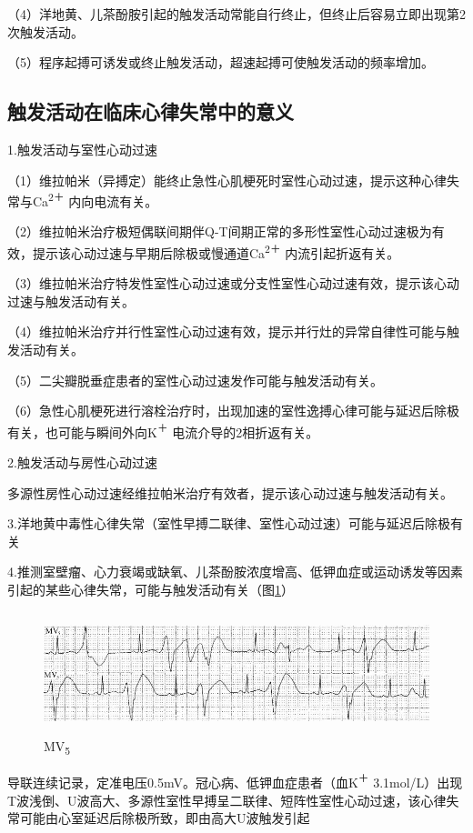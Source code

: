 （4）洋地黄、儿茶酚胺引起的触发活动常能自行终止，但终止后容易立即出现第2次触发活动。

（5）程序起搏可诱发或终止触发活动，超速起搏可使触发活动的频率增加。

\protect\hypertarget{text00024.htmlux5cux23subid305}{}{}

\subsection{触发活动在临床心律失常中的意义}

1.触发活动与室性心动过速

（1）维拉帕米（异搏定）能终止急性心肌梗死时室性心动过速，提示这种心律失常与Ca\textsuperscript{2＋}
内向电流有关。

（2）维拉帕米治疗极短偶联间期伴Q-T间期正常的多形性室性心动过速极为有效，提示该心动过速与早期后除极或慢通道Ca\textsuperscript{2＋}
内流引起折返有关。

（3）维拉帕米治疗特发性室性心动过速或分支性室性心动过速有效，提示该心动过速与触发活动有关。

（4）维拉帕米治疗并行性室性心动过速有效，提示并行灶的异常自律性可能与触发活动有关。

（5）二尖瓣脱垂症患者的室性心动过速发作可能与触发活动有关。

（6）急性心肌梗死进行溶栓治疗时，出现加速的室性逸搏心律可能与延迟后除极有关，也可能与瞬间外向K\textsuperscript{＋}
电流介导的2相折返有关。

2.触发活动与房性心动过速

多源性房性心动过速经维拉帕米治疗有效者，提示该心动过速与触发活动有关。

3.洋地黄中毒性心律失常（室性早搏二联律、室性心动过速）可能与延迟后除极有关

4.推测室壁瘤、心力衰竭或缺氧、儿茶酚胺浓度增高、低钾血症或运动诱发等因素引起的某些心律失常，可能与触发活动有关（图\ref{fig17-2}）

\begin{figure}[!htbp]
 \centering
 \includegraphics[width=5.58333in,height=1.39583in]{./images/Image00301.jpg}
 \captionsetup{justification=centering}
 \caption{MV\textsubscript{5}}
 \label{fig17-2}
  \end{figure} 
导联连续记录，定准电压0.5mV。冠心病、低钾血症患者（血K\textsuperscript{＋}
3.1mol/L）出现T波浅倒、U波高大、多源性室性早搏呈二联律、短阵性室性心动过速，该心律失常可能由心室延迟后除极所致，即由高大U波触发引起

